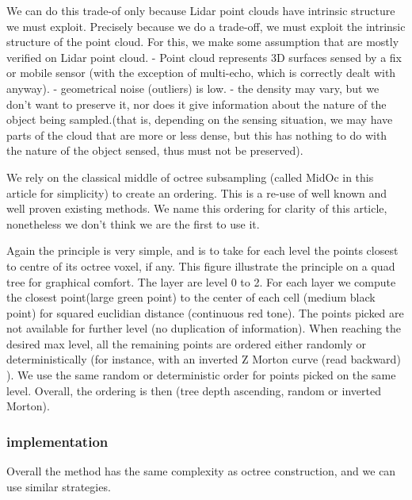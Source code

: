 			We can do this trade-of only because Lidar point clouds have intrinsic structure we must exploit. 
			Precisely because we do a trade-off, we must exploit the intrinsic structure of the point cloud.
			For this, we make some assumption that are mostly verified on Lidar point cloud.
			- Point cloud represents 3D surfaces sensed by a fix or mobile sensor (with the exception of multi-echo, which is correctly dealt with anyway).
			- geometrical noise (outliers) is low.
			- the density may vary, but we don't want to preserve it, nor does it give information about the nature of the object being sampled.(that is, depending on the sensing situation, we may have parts of the cloud that are more or less dense, but this has nothing to do with the nature of the object sensed, thus must not be preserved).
			
			We rely on the classical middle of octree subsampling (called MidOc in this article for simplicity) to create an ordering. This is a re-use of well known and well proven existing methods.
			We name this ordering for clarity of this article, nonetheless we don't think we are the first to use it.
			
			
			
			Again the principle is very simple, and is to take for each level the points closest to centre of its octree voxel, if any.
			This figure illustrate the principle on a quad tree for graphical comfort. The layer are level 0 to 2. For each layer we compute the closest point(large green point) to the center of each cell (medium black point) for squared euclidian distance (continuous red tone). The points picked are not available for further level (no duplication of information).
			When reaching the desired max level, all the remaining points are ordered either randomly or deterministically (for instance, with an inverted Z Morton curve (read backward) ).
			We use the same random or deterministic order for points picked on the same level.
			Overall, the ordering is then (tree depth ascending, random or inverted Morton).
			
		\subsubsection{implementation}
			
			Overall the method has the same complexity as octree construction, and we can use similar strategies.
			

